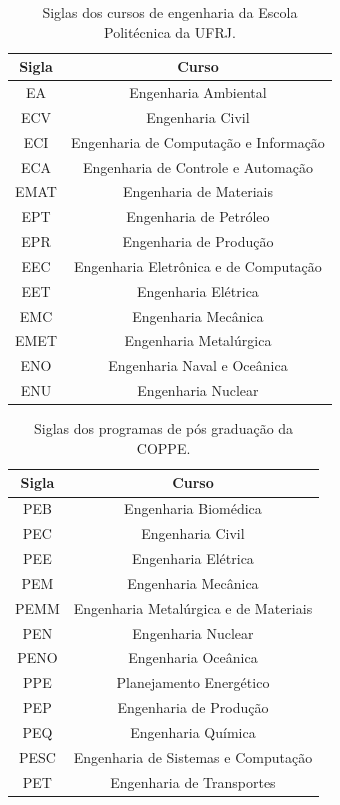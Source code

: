 \documentclass[grad,numbers]{coppe}
\begin{document}
  
  \begin{table}[h]
  	\caption{Siglas dos cursos de engenharia da Escola Politécnica da UFRJ.}
  	\label{tab:courses}
  	\centering
  	{\footnotesize
  		\begin{tabular}{|c|c|}
  			\hline
  			Sigla & Curso\\
  			\hline
  			EA &  Engenharia Ambiental \\
  			ECV & Engenharia Civil\\
  			ECI & Engenharia de Computação e Informação \\
  			ECA & Engenharia de Controle e Automação \\
  			EMAT & Engenharia de Materiais\\
  			EPT & Engenharia de Petróleo\\
  			EPR & Engenharia de Produção\\
  			EEC & Engenharia Eletrônica e de Computação\\
  			EET & Engenharia Elétrica\\
  			EMC & Engenharia Mecânica\\
  			EMET & Engenharia Metalúrgica\\
  			ENO & Engenharia Naval e Oceânica\\
  			ENU & Engenharia Nuclear\\
  			\hline
  	\end{tabular}}
  \end{table}
  
  
  \begin{table}[h]
  	\caption{Siglas dos programas de pós graduação da COPPE.}
  	\label{tab:programs}
  	\centering
  	{\footnotesize
  		\begin{tabular}{|c|c|}
  			\hline
  			Sigla & Curso\\
  			\hline
  			PEB & Engenharia Biomédica \\
  			PEC & Engenharia Civil\\
  			PEE & Engenharia Elétrica \\
  			PEM & Engenharia Mecânica \\
  			PEMM & Engenharia Metalúrgica e de Materiais\\
  			PEN & Engenharia Nuclear\\
  			PENO & Engenharia Oceânica\\
  			PPE & Planejamento Energético\\
  			PEP & Engenharia de Produção\\
  			PEQ & Engenharia Química\\
  			PESC & Engenharia de Sistemas e Computação\\
  			PET & Engenharia de Transportes\\
  			\hline
  	\end{tabular}}
  \end{table}
  
\end{document}
